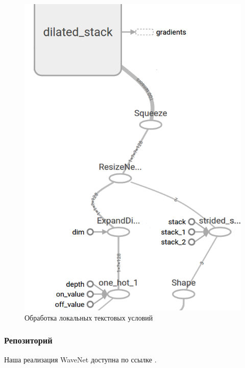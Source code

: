 \documentclass[../diploma.tex]{subfiles}
\begin{document}
\begin{figure}[ht!]
  \centering
  \includegraphics[scale=1]{img/arch}
  \caption{Обработка локальных текстовых условий}
  \label{fig:arch_low}
\end{figure}


\subsubsection{Репозиторий}
Наша реализация WaveNet доступна по ссылке \cite{github:repo}.

\newpage
\pagebreak


\end{document}

